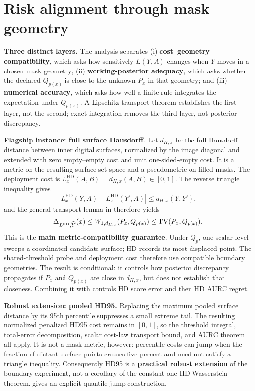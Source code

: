 \section{Risk alignment through mask geometry}
\label{sec:theory}

\noindent\textbf{Three distinct layers.}
The analysis separates (i) \textbf{cost--geometry compatibility}, which asks
how sensitively \(L(Y,A)\) changes when \(Y\) moves in a chosen mask geometry;
(ii) \textbf{working-posterior adequacy}, which asks whether the declared
\(Q_{p(x)}\) is close to the unknown \(P_x\) in that geometry; and
(iii) \textbf{numerical accuracy}, which asks how well a finite rule integrates
the expectation under \(Q_{p(x)}\). A Lipschitz transport theorem establishes
the first layer, not the second; exact integration removes the third layer,
not posterior discrepancy.

\noindent\textbf{Flagship instance: full surface Hausdorff.}
Let \(d_{H,x}\) be the full Hausdorff distance between inner digital surfaces,
normalized by the image diagonal and extended with zero empty--empty cost and
unit one-sided-empty cost. It is a metric on the resulting surface-set space
and a pseudometric on filled masks. The deployment cost is
\(L_x^{\mathrm{HD}}(A,B)=d_{H,x}(A,B)\in[0,1]\). The reverse triangle
inequality gives
\begin{equation*}
  |L_x^{\mathrm{HD}}(Y,A)-L_x^{\mathrm{HD}}(Y',A)|
  \leq d_{H,x}(Y,Y'),
\end{equation*}
and the general transport lemma in  therefore yields
\begin{equation*}
  \Delta_{L^{\mathrm{HD}},\widehat{Y}}(x)
  \leq W_{1,d_{H,x}}(P_x,Q_{p(x)})
  \leq \operatorname{TV}(P_x,Q_{p(x)}).
\end{equation*}
This is the \textbf{main metric-compatibility guarantee}. Under \(Q_p\), one
scalar level sweeps a coordinated candidate surface; HD records its most
displaced point. The shared-threshold probe and deployment cost therefore use
compatible boundary geometries. The result is conditional: it controls how
posterior discrepancy propagates if \(P_x\) and \(Q_{p(x)}\) are close in
\(d_{H,x}\), but does not establish that closeness. Combining it with
 controls HD score error and then HD AURC regret.

\noindent\textbf{Robust extension: pooled HD95.}
Replacing the maximum pooled surface distance by its 95th percentile suppresses
a small extreme tail. The resulting normalized penalized HD95 cost remains in
\([0,1]\), so the threshold integral, total-error decomposition, scalar cost-law
transport bound, and AURC theorem all apply. It is not a mask metric, however:
percentile costs can jump when the fraction of distant surface points crosses
five percent and need not satisfy a triangle inequality. Consequently HD95 is
a \textbf{practical robust extension} of the boundary experiment, not a corollary of the
constant-one HD Wasserstein theorem.  gives an explicit
quantile-jump construction.

